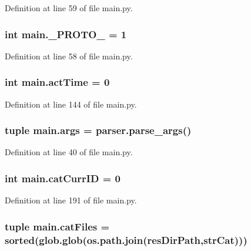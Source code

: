 Definition at line 59 of file main.\-py.

\hypertarget{a00111_afe92b072adc360963093d3660e7684ce}{
\subsubsection[{\-\_\-\-P\-R\-O\-T\-O\-\_\-}]{\setlength{\rightskip}{0pt plus 5cm}int main.\-\_\-\-P\-R\-O\-T\-O\-\_\- = 1}}\label{a00111_afe92b072adc360963093d3660e7684ce}


Definition at line 58 of file main.\-py.

\hypertarget{a00111_a9c2013c88f8354ccf6504c51843f1d5e}{
\subsubsection[{act\-Time}]{\setlength{\rightskip}{0pt plus 5cm}int main.\-act\-Time = 0}}\label{a00111_a9c2013c88f8354ccf6504c51843f1d5e}


Definition at line 144 of file main.\-py.

\hypertarget{a00111_a80760a53c8941c6f6f30e633649ffd8d}{
\subsubsection[{args}]{\setlength{\rightskip}{0pt plus 5cm}tuple main.\-args = parser.\-parse\-\_\-args()}}\label{a00111_a80760a53c8941c6f6f30e633649ffd8d}


Definition at line 40 of file main.\-py.

\hypertarget{a00111_aa56c55225fa65fa569bd8d5f1063550e}{
\subsubsection[{cat\-Curr\-I\-D}]{\setlength{\rightskip}{0pt plus 5cm}int main.\-cat\-Curr\-I\-D = 0}}\label{a00111_aa56c55225fa65fa569bd8d5f1063550e}


Definition at line 191 of file main.\-py.

\hypertarget{a00111_a189dc9cf606d870dacab059d5e7dca24}{
\subsubsection[{cat\-Files}]{\setlength{\rightskip}{0pt plus 5cm}tuple main.\-cat\-Files = sorted(glob.\-glob(os.\-path.\-join({\bf res\-Dir\-Path},{\bf str\-Cat})))}}\label{a00111_a189dc9cf606d870dacab059d5e7dca24}


